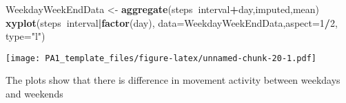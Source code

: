 \documentclass[]{article}
\newenvironment{Shaded}{\begin{snugshade}}{\end{snugshade}}
\newcommand{\KeywordTok}[1]{\textcolor[rgb]{0.13,0.29,0.53}{\textbf{#1}}}
\newcommand{\DataTypeTok}[1]{\textcolor[rgb]{0.13,0.29,0.53}{#1}}
\newcommand{\DecValTok}[1]{\textcolor[rgb]{0.00,0.00,0.81}{#1}}
\newcommand{\StringTok}[1]{\textcolor[rgb]{0.31,0.60,0.02}{#1}}
\newcommand{\OperatorTok}[1]{\textcolor[rgb]{0.81,0.36,0.00}{\textbf{#1}}}
\newcommand{\NormalTok}[1]{#1}
\begin{document}
\begin{Shaded}
\begin{Highlighting}[]
\NormalTok{WeekdayWeekEndData <-}\StringTok{ }\KeywordTok{aggregate}\NormalTok{(steps}\OperatorTok{~}\NormalTok{interval}\OperatorTok{+}\NormalTok{day,imputed,mean)}
\KeywordTok{xyplot}\NormalTok{(steps}\OperatorTok{~}\NormalTok{interval}\OperatorTok{|}\KeywordTok{factor}\NormalTok{(day), }\DataTypeTok{data=}\NormalTok{WeekdayWeekEndData,}\DataTypeTok{aspect=}\DecValTok{1}\OperatorTok{/}\DecValTok{2}\NormalTok{, }\DataTypeTok{type=}\StringTok{"l"}\NormalTok{)}
\end{Highlighting}
\end{Shaded}

\texttt{[image: PA1\_template\_files/figure-latex/unnamed-chunk-20-1.pdf]}

The plots show that there is difference in movement activity between
weekdays and weekends
\end{document}
